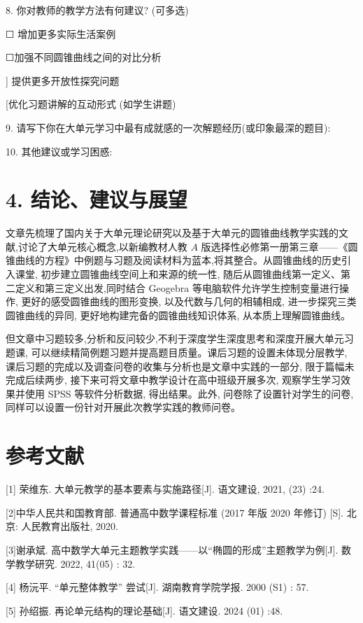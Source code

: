 \documentclass[10pt]{article}
\begin{document}
8. 你对教师的教学方法有何建议? (可多选)

☐ 增加更多实际生活案例

☐加强不同圆锥曲线之间的对比分析

] 提供更多开放性探究问题

[优化习题讲解的互动形式 (如学生讲题)

9. 请写下你在大单元学习中最有成就感的一次解题经历(或印象最深的题目):

10. 其他建议或学习困惑:

\section*{4. 结论、建议与展望}

文章先梳理了国内关于大单元理论研究以及基于大单元的圆锥曲线教学实践的文献,讨论了大单元核心概念,以新编教材人教 \(A\) 版选择性必修第一册第三章——《圆锥曲线的方程》中例题与习题及阅读材料为蓝本,将其整合。从圆锥曲线的历史引入课堂, 初步建立圆锥曲线空间上和来源的统一性, 随后从圆锥曲线第一定义、第二定义和第三定义出发,同时结合 Geogebra 等电脑软件允许学生控制变量进行操作, 更好的感受圆锥曲线的图形变换, 以及代数与几何的相辅相成, 进一步探究三类圆锥曲线的异同, 更好地构建完备的圆锥曲线知识体系, 从本质上理解圆锥曲线。

但文章中习题较多,分析和反问较少,不利于深度学生深度思考和深度开展大单元习题课, 可以继续精简例题习题并提高题目质量。课后习题的设置未体现分层教学, 课后习题的完成以及调查问卷的收集与分析也是文章中实践的一部分, 限于篇幅未完成后续两步, 接下来可将文章中教学设计在高中班级开展多次, 观察学生学习效果并使用 SPSS 等软件分析数据, 得出结果。此外, 问卷除了设置针对学生的问卷,同样可以设置一份针对开展此次教学实践的教师问卷。

\section*{参考文献}

[1] 荣维东. 大单元教学的基本要素与实施路径[J]. 语文建设, 2021, (23) :24.

[2]中华人民共和国教育部. 普通高中数学课程标准 (2017 年版 2020 年修订) [S]. 北京: 人民教育出版社, 2020.

[3]谢承斌. 高中数学大单元主题教学实践——以“椭圆的形成”主题教学为例[J]. 数学教学研究. 2022, 41(05) : 32.

[4] 杨沅平. “单元整体教学” 尝试[J]. 湖南教育学院学报. 2000 (S1) : 57.

[5] 孙绍振. 再论单元结构的理论基础[J]. 语文建设. 2024 (01) :48.
\end{document}
